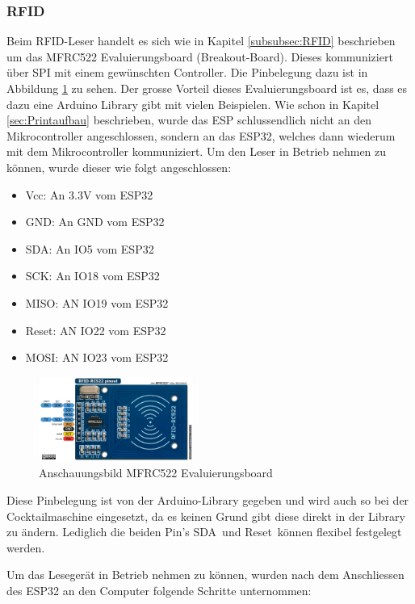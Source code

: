 \subsubsection{RFID}
\label{subsubsec:Inbetriebnahme_RFID}

Beim RFID-Leser handelt es sich wie in Kapitel \ref{subsubsec:RFID} beschrieben um das MFRC522 Evaluierungsboard (Breakout-Board). Dieses kommuniziert über SPI mit einem gewünschten Controller. Die Pinbelegung dazu ist in Abbildung \ref{fig:MFRC522} zu sehen. Der grosse Vorteil dieses Evaluierungsboard ist es, dass es dazu eine Arduino Library gibt mit vielen Beispielen. Wie schon in Kapitel \ref{sec:Printaufbau} beschrieben, wurde das ESP schlussendlich nicht an den Mikrocontroller angeschlossen, sondern an das ESP32, welches dann wiederum mit dem Mikrocontroller kommuniziert. Um den Leser in Betrieb nehmen zu können, wurde dieser wie folgt angeschlossen:


\begin{itemize}
\item Vcc: An 3.3V vom ESP32
\item GND: An GND vom ESP32
\item SDA: An IO5 vom ESP32
\item SCK: An IO18 vom ESP32
\item MISO: AN IO19 vom ESP32
\item Reset: AN IO22 vom ESP32
\item MOSI: AN IO23 vom ESP32
\end{itemize}

\begin{figure}[h!]
\center
\includegraphics[width = 0.45\textwidth]{graphics/MFRC522}
\caption{Anschauungsbild MFRC522 Evaluierungsboard \cite{nxp_bv_2010_antenna_2010}}
\label{fig:MFRC522}
\end{figure}

Diese Pinbelegung ist von der Arduino-Library gegeben und wird auch so bei der Cocktailmaschine eingesetzt, da es keinen Grund gibt diese direkt in der Library zu ändern. Lediglich die beiden Pin's \flqq SDA\frqq~und \flqq Reset\frqq~können flexibel festgelegt werden.

Um das Lesegerät in Betrieb nehmen zu können, wurden nach dem Anschliessen des ESP32 an den Computer folgende Schritte unternommen: 

